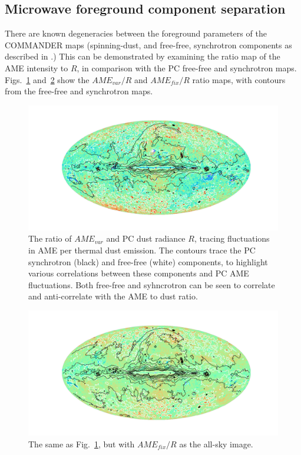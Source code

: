           \subsection{Microwave foreground component separation}
            There are known degeneracies between the foreground parameters of the COMMANDER maps (spinning-dust, and free-free, synchrotron components as described in \cite{planck15X}.) This can be demonstrated by examining the ratio map of the AME intensity to $R$, in comparison with the PC free-free and synchrotron maps. Figs.~\ref{fig:AMEvartoDust_ffandSyncCountours} and~\ref{fig:AMEfixtoDust_ffandSyncCountours} show the $AME_{var}/R$ and $AME_{fix}/R$ ratio maps, with contours from the free-free and synchrotron maps.
                \begin{figure}
                    \includegraphics[width=\textwidth,trim={6cm 2cm 5.0cm 2cm},clip]{../Plots/ch_allsky/AMEvartoDust_ffandSyncCountours.pdf}
                    \centering
                    \caption{The ratio of $AME_{var}$ and PC dust radiance $R$, tracing fluctuations in AME per thermal dust emission. The contours trace the PC synchrotron (black) and free-free (white) components, to highlight various correlations between these components and PC AME fluctuations. Both free-free and syhncrotron can be seen to correlate and anti-correlate with the AME to dust ratio.}
                    \label{fig:AMEvartoDust_ffandSyncCountours}
                \end{figure}
                \begin{figure}
                    \includegraphics[width=\textwidth,trim={6cm 2cm 5.0cm 2cm},clip]{../Plots/ch_allsky/AMEfixtoDust_ffandSyncCountours.pdf}
                    \centering
                    \caption{The same as Fig.~\ref{fig:AMEvartoDust_ffandSyncCountours}, but with $AME_{fix}/R$ as the all-sky image.}
                    \label{fig:AMEfixtoDust_ffandSyncCountours}
                \end{figure}
